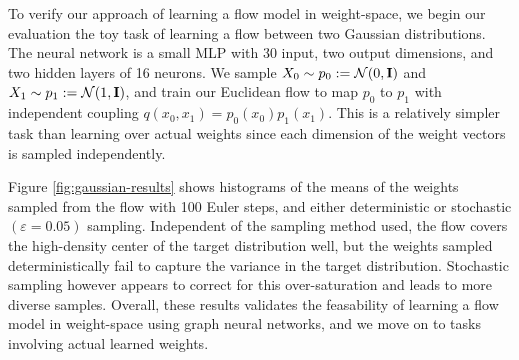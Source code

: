 To verify our approach of learning a flow model in weight-space, we begin our evaluation the toy task of learning a flow between two Gaussian distributions. The neural network is a small MLP with 30 input, two output dimensions, and two hidden layers of 16 neurons. We sample $X_0 \sim p_0 := \mathcal{N}(0, \mathbf{I})$ and $X_1 \sim p_1 := \mathcal{N}(1, \mathbf{I})$, and train our Euclidean flow to map $p_0$ to $p_1$ with independent coupling $q(x_0, x_1) = p_0(x_0)p_1(x_1)$. This is a relatively simpler task than learning over actual weights since each dimension of the weight vectors is sampled independently. 

Figure \ref{fig:gaussian-results} shows histograms of the means of the weights sampled from the flow with 100 Euler steps, and either deterministic or stochastic $(\varepsilon=0.05)$ sampling. Independent of the sampling method used, the flow covers the high-density center of the target distribution well, but the weights sampled deterministically fail to capture the variance in the target distribution. Stochastic sampling however appears to correct for this over-saturation and leads to more diverse samples. Overall, these results validates the feasability of learning a flow model in weight-space using graph neural networks, and we move on to tasks involving actual learned weights. 


